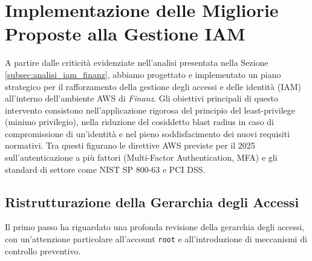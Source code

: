 \section{Implementazione delle Migliorie Proposte alla Gestione IAM}
\label{sec:implementazione_migliorie_iam}

A partire dalle criticità evidenziate nell'analisi presentata nella Sezione \ref{subsec:analisi_iam_finanz}, abbiamo progettato e implementato un piano strategico per il rafforzamento della gestione degli accessi e delle identità (IAM) all'interno dell'ambiente AWS di \emph{Finanz}. Gli obiettivi principali di questo intervento consistono nell'applicazione rigorosa del principio del least-privilege (minimo privilegio), nella riduzione del cosiddetto blast radius in caso di compromissione di un'identità e nel pieno soddisfacimento dei nuovi requisiti normativi. Tra questi figurano le direttive AWS previste per il 2025 sull'autenticazione a più fattori (Multi-Factor Authentication, MFA) e gli standard di settore come NIST SP 800-63 e PCI DSS.

\subsection{Ristrutturazione della Gerarchia degli Accessi}
Il primo passo ha riguardato una profonda revisione della gerarchia degli accessi, con un'attenzione particolare all'account \texttt{root} e all'introduzione di meccanismi di controllo preventivo.

